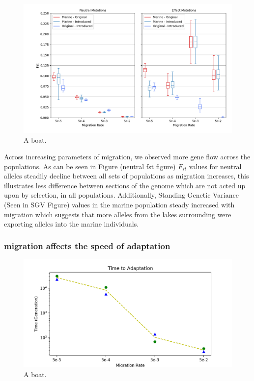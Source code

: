 \documentclass{article}
\begin{document}
\begin{figure}[htb]
	\begin{center}
  		\includegraphics[width=01.0\linewidth]{matplotlib/Fst.png}
  		\caption{A boat.}
  		\label{fig:boat1}
	\end{center}
\end{figure}

Across increasing parameters of migration, we observed more gene flow across the populations. 
As can be seen in Figure (neutral fst figure)
$F_{st}$ values for neutral alleles steadily decline between all sets of populations as 
migration increases, this illustrates less difference between sections of the genome which are not acted up 
upon by selection, in all populations.
Additionally, Standing Genetic Variance 
(Seen in SGV Figure)
values in the marine population steady increased with migration which suggests that more alleles from the 
lakes surrounding were exporting alleles into the marine individuals.


\subsubsection*{migration affects the speed of adaptation}

\begin{figure}[h!tb]
	\begin{center}
  		\includegraphics[width=01.0\linewidth]{matplotlib/TimeToAdaptation.png}
  		\caption{A boat.}
  		\label{fig:boat1}
	\end{center}
\end{figure}
\end{document}
